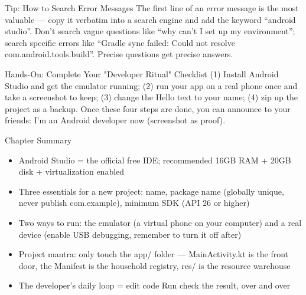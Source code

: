 \begin{tcbinfo}{Tip: How to Search Error Messages}
The first line of an error message is the most valuable — copy it verbatim into a search engine and add the keyword “android studio”. Don't search vague questions like “why can't I set up my environment”; search specific errors like “Gradle sync failed: Could not resolve com.android.tools.build”. Precise questions get precise answers.

\end{tcbinfo}

\begin{tcbpractice}{Hands-On: Complete Your "Developer Ritual" Checklist}
(1) Install Android Studio and get the emulator running; (2) run your app on a real phone once and take a screenshot to keep; (3) change the Hello text to your name; (4) zip up the project as a backup. Once these four steps are done, you can announce to your friends: I'm an Android developer now (screenshot as proof).

\end{tcbpractice}

\begin{tcbsummary}{Chapter Summary}
\begin{itemize}
  \item Android Studio = the official free IDE; recommended 16GB RAM + 20GB disk + virtualization enabled
  \item Three essentials for a new project: name, package name (globally unique, never publish com.example), minimum SDK (API 26 or higher)
  \item Two ways to run: the emulator (a virtual phone on your computer) and a real device (enable USB debugging, remember to turn it off after)
  \item Project mantra: only touch the app/ folder — MainActivity.kt is the front door, the Manifest is the household registry, res/ is the resource warehouse
  \item The developer's daily loop = edit code Run check the result, over and over
\end{itemize}

\end{tcbsummary}
